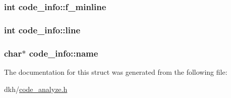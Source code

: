 \hypertarget{structcode__info_ac0a3b579d41a998a2aec410925032aa7}{
\subsubsection[{f\+\_\+minline}]{\setlength{\rightskip}{0pt plus 5cm}int code\+\_\+info\+::f\+\_\+minline}}\label{structcode__info_ac0a3b579d41a998a2aec410925032aa7}
\hypertarget{structcode__info_ad2648840a6e7ba7c9c02ec444a3adac2}{
\subsubsection[{line}]{\setlength{\rightskip}{0pt plus 5cm}int code\+\_\+info\+::line}}\label{structcode__info_ad2648840a6e7ba7c9c02ec444a3adac2}
\hypertarget{structcode__info_ab511aa50afcbcfc1bb2fa4b4a6012e6b}{
\subsubsection[{name}]{\setlength{\rightskip}{0pt plus 5cm}char$\ast$ code\+\_\+info\+::name}}\label{structcode__info_ab511aa50afcbcfc1bb2fa4b4a6012e6b}


The documentation for this struct was generated from the following file\+:\begin{DoxyCompactItemize}
\item 
dkh/\hyperlink{code__analyze_8h}{code\+\_\+analyze.\+h}\end{DoxyCompactItemize}
